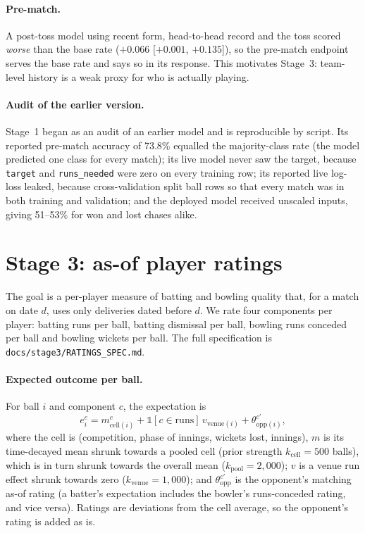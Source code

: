 \documentclass[11pt]{article}
\newcommand{\code}[1]{\texttt{#1}}
\begin{document}
\paragraph{Pre-match.} A post-toss model using recent form, head-to-head record and the toss scored
\emph{worse} than the base rate ($+0.066$ [$+0.001$, $+0.135$]), so the pre-match endpoint serves the base
rate and says so in its response. This motivates Stage~3: team-level history is a weak proxy for who is
actually playing.

\paragraph{Audit of the earlier version.} Stage~1 began as an audit of an earlier model and is reproducible
by script. Its reported pre-match accuracy of 73.8\% equalled the majority-class rate (the model predicted
one class for every match); its live model never saw the target, because \code{target} and
\code{runs\_needed} were zero on every training row; its reported live log-loss leaked, because
cross-validation split ball rows so that every match was in both training and validation; and the
deployed model received unscaled inputs, giving 51--53\% for won and lost chases alike.

\section{Stage 3: as-of player ratings}\label{sec:ratings}

The goal is a per-player measure of batting and bowling quality that, for a match on date $d$, uses only
deliveries dated before $d$. We rate four components per player: batting runs per ball, batting
dismissal per ball, bowling runs conceded per ball and bowling wickets per ball. The full specification
is \code{docs/stage3/RATINGS\_SPEC.md}.

\paragraph{Expected outcome per ball.} For ball $i$ and component $c$, the expectation is
\begin{equation}
  e_i^c = m^c_{\text{cell}(i)} + \mathbb 1[c\in\text{runs}]\,v_{\text{venue}(i)} + \theta^{c'}_{\text{opp}(i)},
\end{equation}
where the cell is (competition, phase of innings, wickets lost, innings), $m$ is its time-decayed mean shrunk
towards a pooled cell (prior strength $k_{\text{cell}}=500$ balls), which is in turn shrunk towards the overall
mean ($k_{\text{pool}}=2{,}000$); $v$ is a venue run effect shrunk towards zero ($k_{\text{venue}}=1{,}000$);
and $\theta^{c'}_{\text{opp}}$ is the opponent's matching as-of rating (a batter's expectation includes the
bowler's runs-conceded rating, and vice versa). Ratings are deviations from the cell average, so the
opponent's rating is added as is.
\end{document}
